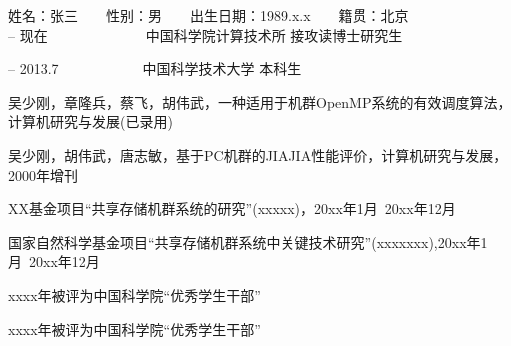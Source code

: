 \begin{resume}

\noindent
姓名：张三　　性别：男　　出生日期：1989.x.x　　籍贯：北京\\

 -- 现在　　　　　　　中国科学院计算技术所 接攻读博士研究生

 -- 2013.7　　　　　　中国科学技术大学 本科生\\


  \begin{enumerate}[{[}1{]}]
  \item 吴少刚，章隆兵，蔡飞，胡伟武，一种适用于机群OpenMP系统的有效调度算法，计算机研究与发展(已录用)
  \item 吴少刚，胡伟武，唐志敏，基于PC机群的JIAJIA性能评价，计算机研究与发展，2000年增刊

  \end{enumerate}

  \begin{enumerate}[{[}1{]}]
  \item XX基金项目“共享存储机群系统的研究”(xxxxx)，20xx年1月~20xx年12月
  \item 国家自然科学基金项目“共享存储机群系统中关键技术研究”(xxxxxxx),20xx年1月~20xx年12月
  \end{enumerate}

  \begin{enumerate}[{[}1{]}]
  \item  xxxx年被评为中国科学院“优秀学生干部”
  \item xxxx年被评为中国科学院“优秀学生干部”
  \end{enumerate}
\end{resume}
